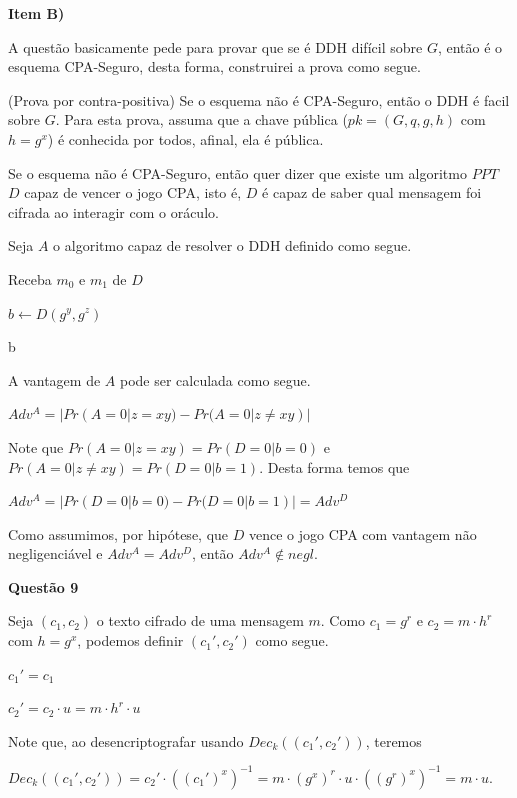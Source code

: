 \documentclass{article}
\begin{document}
\textbf{Item B)}

    A questão basicamente pede para provar que se é DDH difícil sobre $G$, então é o esquema CPA-Seguro, desta forma, construirei a prova como segue.

    (Prova por contra-positiva) Se o esquema não é CPA-Seguro, então o DDH é facil sobre $G$. Para esta prova, assuma que a chave pública ($pk = (G,q,g,h)$ com $h = g^x$) é conhecida por todos, afinal, ela é pública.

    Se o esquema não é CPA-Seguro, então quer dizer que existe um algoritmo $PPT$ $D$ capaz de vencer o jogo CPA, isto é, $D$ é capaz de saber qual mensagem foi cifrada ao interagir com o oráculo.

    Seja $A$ o algoritmo capaz de resolver o DDH definido como segue.


    \begin{algorithm}[H]
        \caption{$A$}

        Receba $m_0$ e $m_1$ de $D$

        $b \leftarrow D(g^y, g^z)$

        \Return b        
    \end{algorithm}    

    A vantagem de $A$ pode ser calculada como segue.

    $Adv^A = |Pr(A = 0 | z=xy) - Pr(A = 0 | z \neq xy) |$

    Note que $Pr(A = 0 | z=xy) = Pr(D = 0 | b=0)$ e $Pr(A = 0 | z \neq xy) = Pr(D = 0 | b = 1)$. Desta forma temos que

    $Adv^A = |Pr(D = 0 | b=0) - Pr(D = 0 | b = 1)| = Adv^D$

    Como assumimos, por hipótese, que $D$ vence o jogo CPA com vantagem não negligenciável e $Adv^A = Adv^D$, então $Adv^A \notin negl$.

\textbf{Questão 9}

    Seja $(c_1, c_2)$ o texto cifrado de uma mensagem $m$. Como $c_1 = g^r$ e $c_2 = m \cdot h^r$ com $h = g^x$, podemos definir $(c_1', c_2')$ como segue.

    $c_1' = c_1$

    $c_2'= c_2 \cdot u = m \cdot h^r \cdot u$

    Note que, ao desencriptografar usando $Dec_k((c_1',c_2'))$, teremos

    $Dec_k((c_1',c_2')) = c_2' \cdot ((c_1')^x)^{-1} = m \cdot (g^x)^r \cdot u \cdot ((g^r)^x)^{-1} = m \cdot u$.
\end{document}
